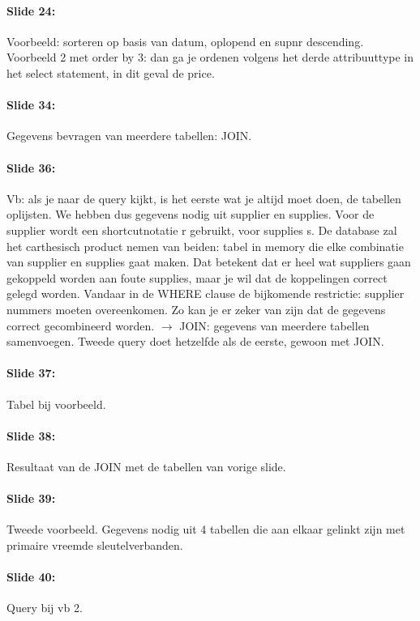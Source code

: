 \documentclass[10pt,a4paper]{report}
\begin{document}
\paragraph{Slide 24:}Voorbeeld: sorteren op basis van datum, oplopend en supnr descending. Voorbeeld 2 met order by 3: dan ga je ordenen volgens het derde attribuuttype in het select statement, in dit geval de price.

\paragraph{Slide 34:}Gegevens bevragen van meerdere tabellen: JOIN.

\paragraph{Slide 36:}Vb: als je naar de query kijkt, is het eerste wat je altijd moet doen, de tabellen oplijsten. We hebben dus gegevens nodig uit supplier en supplies. Voor de supplier wordt een shortcutnotatie r gebruikt, voor supplies s. De database zal het carthesisch product nemen van beiden: tabel in memory die elke combinatie van supplier en supplies gaat maken. Dat betekent dat er heel wat suppliers gaan gekoppeld worden aan foute supplies, maar je wil dat de koppelingen correct gelegd worden. Vandaar in de WHERE clause de bijkomende restrictie: supplier nummers moeten overeenkomen. Zo kan je er zeker van zijn dat de gegevens correct gecombineerd worden. $\rightarrow$ JOIN: gegevens van meerdere tabellen samenvoegen.
Tweede query doet hetzelfde als de eerste, gewoon met JOIN.

\paragraph{Slide 37:}Tabel bij voorbeeld.

\paragraph{Slide 38:}Resultaat van de JOIN met de tabellen van vorige slide.

\paragraph{Slide 39:}Tweede voorbeeld. Gegevens nodig uit 4 tabellen die aan elkaar gelinkt zijn met primaire vreemde sleutelverbanden.

\paragraph{Slide 40:}Query bij vb 2.
\end{document}
